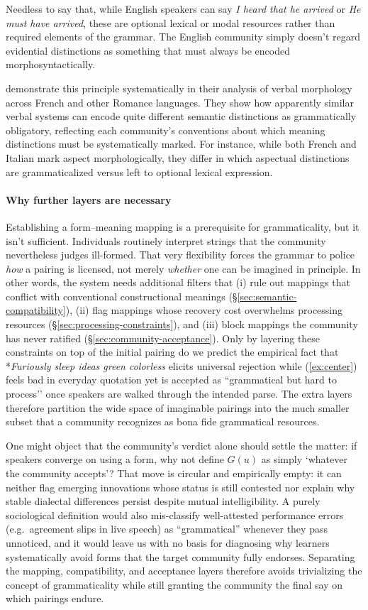 \documentclass[12pt,letterpaper]{article}
\begin{document}
Needless to say that, while English speakers can say \textit{I heard that he arrived} or \textit{He must have arrived}, these are optional lexical or modal resources rather than required elements of the grammar. The English community simply doesn't regard evidential distinctions as something that must always be encoded morphosyntactically.

\textcite{kilani2005} demonstrate this principle systematically in their analysis of verbal morphology across French and other Romance languages. They show how apparently similar verbal systems can encode quite different semantic distinctions as grammatically obligatory, reflecting each community's conventions about which meaning distinctions must be systematically marked. For instance, while both French and Italian mark aspect morphologically, they differ in which aspectual distinctions are grammaticalized versus left to optional lexical expression.

\paragraph{Why further layers are necessary}
Establishing a form--meaning mapping is a prerequisite for grammaticality, but it isn't sufficient. Individuals routinely interpret strings that the community nevertheless judges ill-formed. That very flexibility forces the grammar to police \emph{how} a pairing is licensed, not merely \emph{whether} one can be imagined in principle. In other words, the system needs additional filters that (i) rule out mappings that conflict with conventional constructional meanings (\S\ref{sec:semantic-compatibility}), (ii) flag mappings whose recovery cost overwhelms processing resources (\S\ref{sec:processing-constraints}), and (iii) block mappings the community has never ratified (\S\ref{sec:community-acceptance}). Only by layering these constraints on top of the initial pairing do we predict the empirical fact that *\textit{Furiously sleep ideas green colorless} elicits universal rejection while (\ref{ex:center}) feels bad in everyday quotation yet is accepted as “grammatical but hard to process’’ once speakers are walked through the intended parse. The extra layers therefore partition the wide space of imaginable pairings into the much smaller subset that a community recognizes as bona fide grammatical resources.

One might object that the community’s verdict alone should settle the matter: if speakers converge on using a form, why not define $G(u)$ as simply `whatever the community accepts'? That move is circular and empirically empty: it can neither flag emerging innovations whose status is still contested nor explain why stable dialectal differences persist despite mutual intelligibility. A purely sociological definition would also mis-classify well-attested performance errors (e.g.\ agreement slips in live speech) as \enquote{grammatical} whenever they pass unnoticed, and it would leave us with no basis for diagnosing why learners systematically avoid forms that the target community fully endorses. Separating the mapping, compatibility, and acceptance layers therefore avoids trivializing the concept of grammaticality while still granting the community the final say on which pairings endure.
\end{document}
